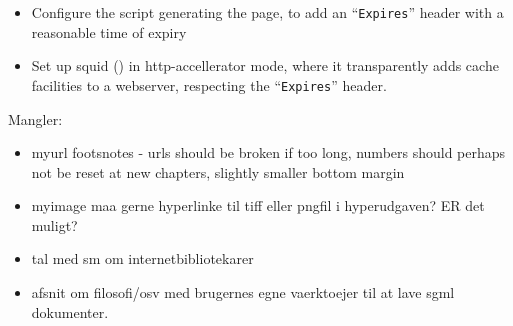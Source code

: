 \documentclass[11pt,ddraft,a4paper]{report}
\begin{document}
\begin{itemize}
\item Configure the script generating the page, to add an
  ``\texttt{Expires}'' header with a reasonable time of expiry
\item Set up squid () in http-accellerator mode, where
  it transparently adds cache facilities to a webserver, respecting
  the ``\texttt{Expires}'' header.
\end{itemize}


Mangler:

\begin{itemize}
\item myurl footsnotes - urls should be broken if too long, numbers
  should perhaps not be reset at new chapters, slightly smaller bottom
  margin 
  
  
  
\item myimage maa gerne hyperlinke til tiff eller pngfil i
  hyperudgaven?  ER det muligt?
\item tal med sm om internetbibliotekarer
\item afsnit om filosofi/osv med brugernes egne vaerktoejer til at
  lave sgml dokumenter.

  
\end{itemize}
\end{document}
